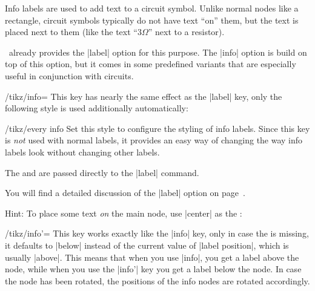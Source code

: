 Info labels are used to add text to a circuit symbol. Unlike normal
nodes like a rectangle, circuit symbols typically do not have text
``on'' them, but the text is placed next to them (like the text
``$3\Omega$'' next to a resistor).

\tikzname\ already provides the |label| option for this purpose. The
|info| option is build on top of this option, but it comes in some
predefined variants that are especially useful in conjunction with
circuits.

\begin{key}{/tikz/info=}
  This key has nearly the same effect as the |label| key, only the
  following style is used additionally automatically:
  \begin{stylekey}{/tikz/every info}
    Set this style to configure the styling of info labels. Since this
    key is \emph{not} used with normal labels, it provides an easy way
    of changing the way info labels look without changing other
    labels. 
  \end{stylekey}
  The  and  are passed directly to the
  |label| command.
\begin{codeexample}[]
\begin{tikzpicture}[circuit ee IEC,every info/.style=red]
  \node [resistor,info=$3\Omega$] {};
\end{tikzpicture}
\end{codeexample}

  You will find a detailed discussion of the |label| option on
  page~\pageref{label-option}.

  Hint: To place some text \emph{on} the main node, use |center| as
  the :
\begin{codeexample}[]
\end{codeexample}
\end{key}

\begin{key}{/tikz/info'=}
  This key works exactly like the |info| key, only in case the
   is missing, it defaults to |below| instead of the
  current value of  |label position|, which is usually |above|. This
  means that when you use |info|, you get a label above the node,
  while when you use the |info'| key you get a label below the
  node. In case the node has been rotated, the positions of the info
  nodes are rotated accordingly.
\begin{codeexample}[]
\end{codeexample}
\end{key}

